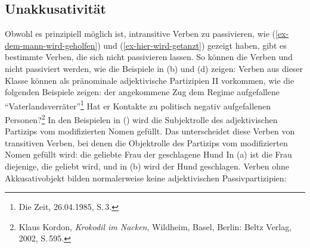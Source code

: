 \subsection{Unakkusativität}
\label{sec-unakkusativitaet}\label{sec-unaccusativity}
\label{sec-phen-hilfsverbselektion}


Obwohl es prinzipiell möglich ist, intransitive Verben zu passivieren, wie
(\ref{ex-dem-mann-wird-geholfen}) und (\ref{ex-hier-wird-getanzt}) gezeigt haben,
gibt es bestimmte Verben, die sich nicht passivieren lassen.
So können die Verben  und   nicht passiviert werden,
wie die Beispiele in (b) und (d) zeigen:
\eal
\label{ex-passive-erg}
\zl
{}%
Verben aus dieser Klasse können als pränominale adjektivische Partizipien II vorkommen,
wie die folgenden Beispiele zeigen:
\eal
\label{ex-prenominal-erg}
\ex 
der angekommene Zug
\ex
dem Regime aufgefallene "`Vaterlandsverräter"'\footnote{
        Die Zeit, 26.04.1985, S.\,3.%
}
\ex Hat er Kontakte zu politisch negativ aufgefallenen Personen?\footnote{
   Klaus Kordon, \emph{Krokodil im Nacken}, Wildheim, Basel, Berlin: Beltz Verlag, 2002, S.\,595.%
}
\zl
In den Beispielen in () wird die Subjektrolle des adjektivischen Partizips vom
modifizierten Nomen gefüllt. Das unterscheidet diese Verben von transitiven Verben,
bei denen die Objektrolle des Partizips vom modifizierten Nomen gefüllt wird:
\eal
\ex die geliebte Frau
\ex der geschlagene Hund
\zl
In (a) ist die Frau diejenige, die geliebt wird, und in (b)
wird der Hund geschlagen. Verben ohne Akkusativobjekt bilden normalerweise
keine adjektivischen Passivpartizipien:
\eal
\label{ex-prenominal-nerg}
\zl

